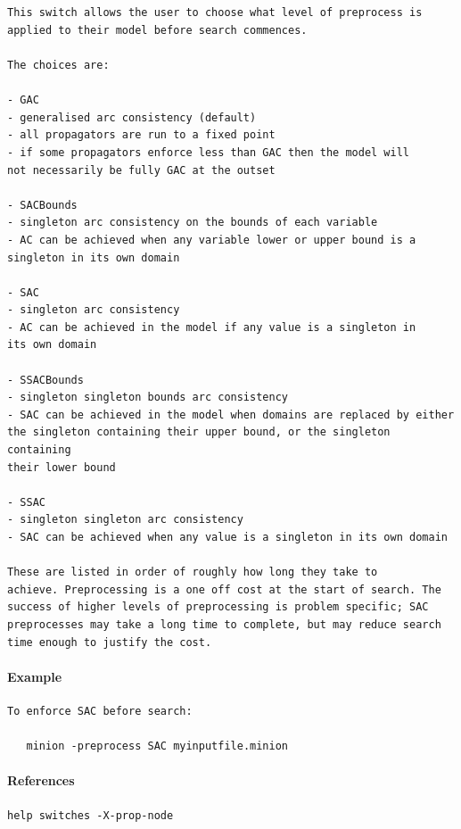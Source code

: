\documentclass[oneside]{book}
\begin{document}
\paragraph{}
{\footnotesize
\begin{verbatim}

This switch allows the user to choose what level of preprocess is
applied to their model before search commences.

The choices are:

- GAC 
- generalised arc consistency (default)
- all propagators are run to a fixed point
- if some propagators enforce less than GAC then the model will
not necessarily be fully GAC at the outset

- SACBounds 
- singleton arc consistency on the bounds of each variable
- AC can be achieved when any variable lower or upper bound is a 
singleton in its own domain

- SAC 
- singleton arc consistency
- AC can be achieved in the model if any value is a singleton in
its own domain

- SSACBounds
- singleton singleton bounds arc consistency
- SAC can be achieved in the model when domains are replaced by either
the singleton containing their upper bound, or the singleton containing
their lower bound

- SSAC 
- singleton singleton arc consistency
- SAC can be achieved when any value is a singleton in its own domain

These are listed in order of roughly how long they take to
achieve. Preprocessing is a one off cost at the start of search. The
success of higher levels of preprocessing is problem specific; SAC
preprocesses may take a long time to complete, but may reduce search
time enough to justify the cost.
\end{verbatim}
}
\paragraph{Example}
{\footnotesize
\begin{verbatim}
To enforce SAC before search:

   minion -preprocess SAC myinputfile.minion
\end{verbatim}
}
\paragraph{References}
{\footnotesize
\begin{verbatim}
help switches -X-prop-node
\end{verbatim}
}
\end{document}
